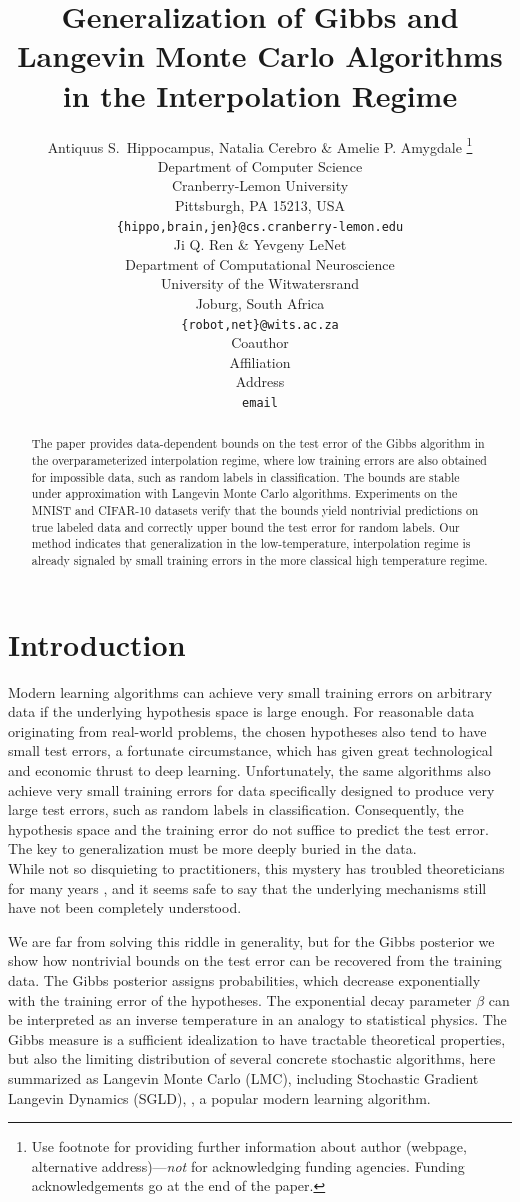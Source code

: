\documentclass{article} %
\title{Generalization of Gibbs and Langevin Monte Carlo Algorithms in the Interpolation Regime}
\author{Antiquus S.~Hippocampus, Natalia Cerebro \& Amelie P. Amygdale \thanks{Use footnote for providing further information
about author (webpage, alternative address)---\emph{not} for acknowledging
funding agencies.  Funding acknowledgements go at the end of the paper.} \\
Department of Computer Science\\
Cranberry-Lemon University\\
Pittsburgh, PA 15213, USA \\
\texttt{\{hippo,brain,jen\}@cs.cranberry-lemon.edu} \\
\And
Ji Q. Ren \& Yevgeny LeNet \\
Department of Computational Neuroscience \\
University of the Witwatersrand \\
Joburg, South Africa \\
\texttt{\{robot,net\}@wits.ac.za} \\
\AND
Coauthor \\
Affiliation \\
Address \\
\texttt{email}
}
\begin{document}
\maketitle

\begin{abstract}
The paper provides data-dependent bounds on the test error of the Gibbs algorithm in the overparameterized interpolation regime, where low training errors are also obtained for impossible data, such as random labels in classification. The bounds are stable under approximation with Langevin Monte Carlo algorithms. Experiments on the MNIST and CIFAR-10 datasets verify that the bounds yield nontrivial predictions on true labeled data and correctly upper bound the test error for random labels. Our method indicates that generalization in the low-temperature, interpolation regime is already signaled by small training errors in the more classical high temperature regime.
\end{abstract}

\section{Introduction\label{Section introduction}}
Modern learning algorithms can achieve very small training errors on arbitrary data if the underlying hypothesis space is large enough. For reasonable data originating from real-world problems, the chosen hypotheses also tend to have small test errors, a fortunate circumstance, which has given great technological and economic thrust to deep learning.
Unfortunately, the same algorithms also achieve very small training errors for data specifically designed to produce very large test errors, such as random labels in classification. Consequently, the hypothesis space and the training error do not suffice to predict
the test error. The key to generalization must be more deeply buried in the data. \\
While not so disquieting to practitioners, this mystery has troubled theoreticians for many years \citep{zhang2016understanding,zhang2021understanding}, and it seems safe to say that the underlying mechanisms still have not been completely understood.

We are far from solving this riddle in generality, but for the Gibbs posterior we show how nontrivial bounds on the test error can be recovered from the training data. The Gibbs posterior assigns probabilities, which decrease exponentially with the training error of the hypotheses. The exponential decay parameter $\beta $ can be interpreted as an inverse temperature in an analogy to statistical physics. The Gibbs measure is a sufficient idealization to have tractable theoretical properties, but also
the limiting distribution of several concrete stochastic
algorithms, here summarized as Langevin Monte Carlo (LMC), including
Stochastic Gradient Langevin Dynamics (SGLD), \citep{gelfand1991recursive,welling2011bayesian}, a popular modern learning algorithm. 
\end{document}
